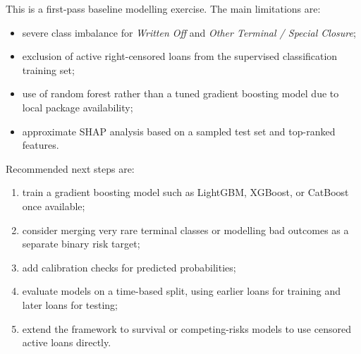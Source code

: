 \documentclass[11pt]{article}
\begin{document}
This is a first-pass baseline modelling exercise. The main limitations are:

\begin{itemize}
    \item severe class imbalance for \textit{Written Off} and \textit{Other Terminal / Special Closure};
    \item exclusion of active right-censored loans from the supervised classification training set;
    \item use of random forest rather than a tuned gradient boosting model due to local package availability;
    \item approximate SHAP analysis based on a sampled test set and top-ranked features.
\end{itemize}

Recommended next steps are:

\begin{enumerate}
    \item train a gradient boosting model such as LightGBM, XGBoost, or CatBoost once available;
    \item consider merging very rare terminal classes or modelling bad outcomes as a separate binary risk target;
    \item add calibration checks for predicted probabilities;
    \item evaluate models on a time-based split, using earlier loans for training and later loans for testing;
    \item extend the framework to survival or competing-risks models to use censored active loans directly.
\end{enumerate}
\end{document}
